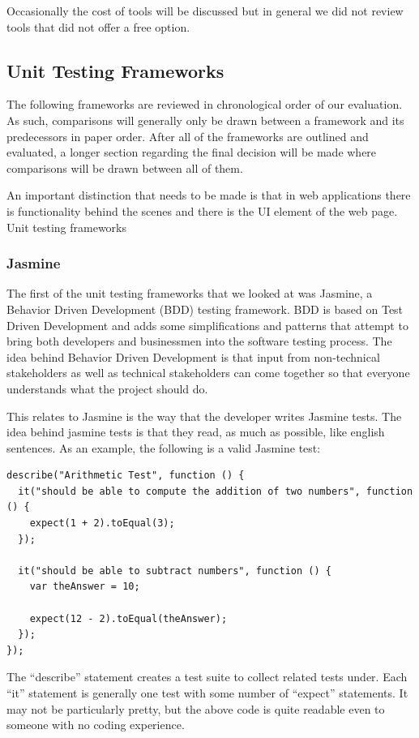 \documentclass[11pt]{article}
\begin{document}
Occasionally the cost of tools will be discussed but in general we did not review tools that did not offer a free option.

\subsection{Unit Testing Frameworks}
The following frameworks are reviewed in chronological order of our evaluation. As such, comparisons will generally only be drawn between a framework and its predecessors in paper order. After all of the frameworks are outlined and evaluated, a longer section regarding the final decision will be made where comparisons will be drawn between all of them. 

An important distinction that needs to be made is that in web applications there is functionality behind the scenes and there is the UI element of the web page. Unit testing frameworks 

\subsubsection{Jasmine \cite{Jasmine}}
The first of the unit testing frameworks that we looked at was Jasmine, a Behavior Driven Development (BDD) testing framework. BDD is based on Test Driven Development and adds some simplifications and patterns that attempt to bring both developers and businessmen into the software testing process. The idea behind Behavior Driven Development is that input from non-technical stakeholders as well as technical stakeholders can come together so that everyone understands what the project should do.

This relates to Jasmine is the way that the developer writes Jasmine tests. The idea behind jasmine tests is that they read, as much as possible, like english sentences. As an example, the following is a valid Jasmine test:
\begin{lstlisting}
describe("Arithmetic Test", function () {
  it("should be able to compute the addition of two numbers", function () {
    expect(1 + 2).toEqual(3);
  });

  it("should be able to subtract numbers", function () {
    var theAnswer = 10;

    expect(12 - 2).toEqual(theAnswer);
  });
});
\end{lstlisting}
The ``describe'' statement creates a test suite to collect related tests under. Each ``it'' statement is generally one test with some number of ``expect'' statements. It may not be particularly pretty, but the above code is quite readable even to someone with no coding experience.
\end{document}
